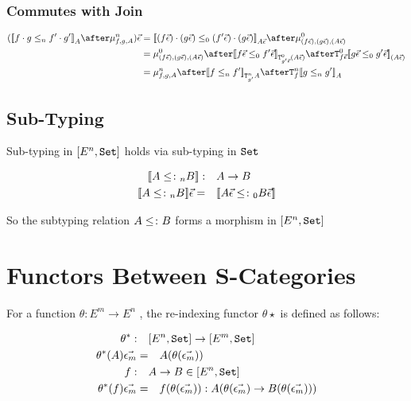 \documentclass{report}
\begin{document}
\subsubsection{Commutes with Join}


\begin{align}
    (\dsen{f\dot g}{f'\dot g'}_A\after\bindn{f}{g}{A})\ev & = \dsez{(f\ev)\dot(g\ev)}{(f'\ev)\dot (g\ev)}_{A\ev}\after\bindz{(f\ev)}{(g\ev)}{(A\ev)}\\
    & = \bindz{(f\ev)}{(g\ev)}{(A\ev)}\after\dsez{f\ev}{f'\ev}_{\Tz{g'\ev}{(A\ev)}}\after \Tz{f\ev}{\dsez{g\ev}{g'\ev}}_{(A\ev)}\\
    &= \bindn{f}{g}{A}\after\dsen{f}{f'}_{\Tn{g'}{A}}\after\Tn{f}{\dsen{g}{g'}}_A
\end{align}

\subsection{Sub-Typing}
Sub-typing in $[E^n, \texttt{Set}]$ holds via sub-typing in $\texttt{Set}$

\begin{align}
    {\bf [\![}A\leq\colon_n B{\bf ]\!]}:&\quad A\rightarrow B\\
    {\bf [\![}A\leq\colon_n B{\bf ]\!]}\vec{\epsilon}=&\quad {\bf [\![}A\vec{\epsilon}\leq\colon_0 B\vec{\epsilon}{\bf ]\!]}
\end{align}

So the subtyping relation $A \leq\colon B$ forms a morphism in $[E^n, \texttt{Set}]$

\section{Functors Between S-Categories}
For a function $\theta: E^m \rightarrow E^n$ , the re-indexing functor $\theta\star$ is defined as follows:

\begin{align}
    \theta^*:\quad& [E^n, \texttt{Set}] \rightarrow [E^m, \texttt{Set}]\\
    \theta^*(A)\vec{\epsilon_m}=&\quad A(\theta (\vec{\epsilon_m}))\\
    f:\quad& A \rightarrow B \in[E^n, \texttt{Set}]\\
    \theta^*(f)\vec{\epsilon_m} =&\quad f(\theta(\vec{\epsilon_m})): A(\theta(\vec{\epsilon_m})\rightarrow B(\theta(\vec{\epsilon_m})))
\end{align}
\end{document}
